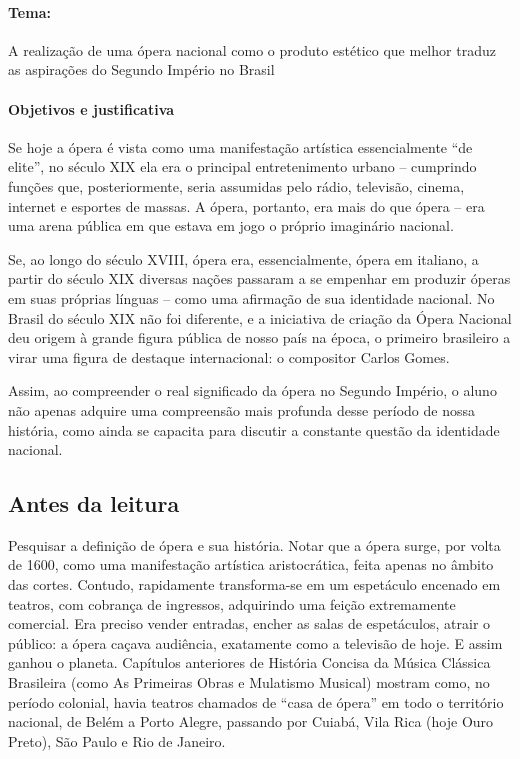 \documentclass[11pt]{extarticle}
\begin{document}
\paragraph{Tema:} A realização de uma ópera nacional como o produto estético que melhor
traduz as aspirações do Segundo Império no Brasil 



\paragraph{Objetivos e justificativa}

Se hoje a ópera é vista como uma manifestação artística essencialmente “de
elite”, no século XIX ela era o principal entretenimento urbano – cumprindo
funções que, posteriormente, seria assumidas pelo rádio, televisão, cinema,
internet e esportes de massas. A ópera, portanto, era mais do que ópera – era
uma arena pública em que estava em jogo o próprio imaginário nacional.

Se, ao longo do século XVIII, ópera era, essencialmente, ópera em italiano, a
partir do século XIX diversas nações passaram a se empenhar em produzir óperas
em suas próprias línguas – como uma afirmação de sua identidade nacional. No
Brasil do século XIX não foi diferente, e a iniciativa de criação da Ópera
Nacional deu origem à grande figura pública de nosso país na época, o primeiro
brasileiro a virar uma figura de destaque internacional: o compositor Carlos
Gomes.


Assim, ao compreender o real significado da ópera no Segundo Império, o aluno
não apenas adquire uma compreensão mais profunda desse período de nossa
história, como ainda se capacita para discutir a constante questão da
identidade nacional.


\subsection{Antes da leitura}

Pesquisar a definição de ópera e sua história. Notar que a ópera surge, por
volta de 1600, como uma manifestação artística aristocrática, feita apenas no
âmbito das cortes. Contudo, rapidamente transforma-se em um espetáculo encenado
em teatros, com cobrança de ingressos, adquirindo uma feição extremamente
comercial. Era preciso vender entradas, encher as salas de espetáculos, atrair
o público: a ópera caçava audiência, exatamente como a televisão de hoje. E
assim ganhou o planeta. Capítulos anteriores de História Concisa da Música
Clássica Brasileira (como As Primeiras Obras e Mulatismo Musical) mostram como,
no período colonial, havia teatros chamados de “casa de ópera” em todo o
território nacional, de Belém a Porto Alegre, passando por Cuiabá, Vila Rica
(hoje Ouro Preto), São Paulo e Rio de Janeiro.
\end{document}
